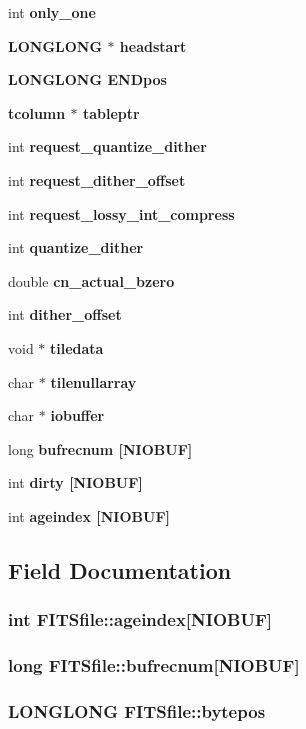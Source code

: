 \begin{CompactItemize}
int \bf{only\_\-one}
\item 
\bf{LONGLONG} $\ast$ \bf{headstart}
\item 
\bf{LONGLONG} \bf{ENDpos}
\item 
\bf{tcolumn} $\ast$ \bf{tableptr}
\item 
int \bf{request\_\-quantize\_\-dither}
\item 
int \bf{request\_\-dither\_\-offset}
\item 
int \bf{request\_\-lossy\_\-int\_\-compress}
\item 
int \bf{quantize\_\-dither}
\item 
double \bf{cn\_\-actual\_\-bzero}
\item 
int \bf{dither\_\-offset}
\item 
void $\ast$ \bf{tiledata}
\item 
char $\ast$ \bf{tilenullarray}
\item 
char $\ast$ \bf{iobuffer}
\item 
long \bf{bufrecnum} [NIOBUF]
\item 
int \bf{dirty} [NIOBUF]
\item 
int \bf{ageindex} [NIOBUF]
\end{CompactItemize}


\subsection{Field Documentation}
\subsubsection{\setlength{\rightskip}{0pt plus 5cm}int \bf{FITSfile::ageindex}[NIOBUF]}\label{structFITSfile_58073e170977e55bab8e3a7af4cd8c84}


\subsubsection{\setlength{\rightskip}{0pt plus 5cm}long \bf{FITSfile::bufrecnum}[NIOBUF]}\label{structFITSfile_11a4f089b13a2094847af06f6971367b}


\subsubsection{\setlength{\rightskip}{0pt plus 5cm}\bf{LONGLONG} \bf{FITSfile::bytepos}}\label{structFITSfile_31328a04ea1d6cd9c44014c34b4c6fed}


